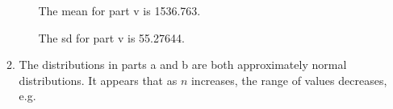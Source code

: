 \documentclass[12pt,letterpaper]{article}
\begin{document}
\begin{enumerate}
\begin{enumerate}
\begin{enumerate}
              The mean for part v is \num{1536.763}.

              The sd for part v is \num{55.27644}.
          \end{enumerate}
        \item
          The distributions in parts a and b are both approximately normal distributions.
          It appears that as $n$ increases, the range of values decreases, e.g.

      \end{enumerate}
  \end{enumerate}

  
\end{document}
